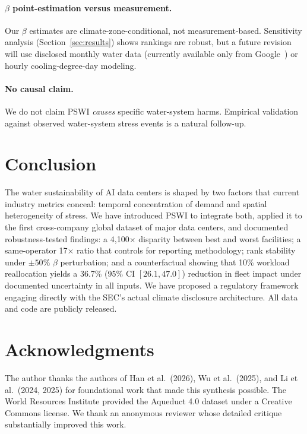 \documentclass[conference,10pt]{IEEEtran}
\begin{document}
\paragraph{$\beta$ point-estimation versus measurement.}
Our $\beta$ estimates are climate-zone-conditional, not measurement-based.
Sensitivity analysis (Section~\ref{sec:results}) shows rankings are
robust, but a future revision will use disclosed monthly water data
(currently available only from Google~\cite{google2025envreport}) or
hourly cooling-degree-day modeling.

\paragraph{No causal claim.}
We do not claim PSWI \emph{causes} specific water-system harms.
Empirical validation against observed water-system stress events is a
natural follow-up.

\section{Conclusion}
\label{sec:conclusion}

The water sustainability of AI data centers is shaped by two factors
that current industry metrics conceal: temporal concentration of
demand and spatial heterogeneity of stress. We have introduced PSWI
to integrate both, applied it to the first cross-company global
dataset of major data centers, and documented robustness-tested
findings: a 4{,}100$\times$ disparity between best and worst facilities;
a same-operator 17$\times$ ratio that controls for reporting
methodology; rank stability under $\pm 50\%$ $\beta$ perturbation;
and a counterfactual showing that 10\% workload reallocation yields a
36.7\% (95\% CI $[26.1, 47.0]$) reduction in fleet impact under
documented uncertainty in all inputs. We have proposed a regulatory
framework engaging directly with the SEC's actual climate disclosure
architecture. All data and code are publicly released.

\section*{Acknowledgments}

The author thanks the authors of Han et al.~(2026), Wu et al.~(2025),
and Li et al.~(2024, 2025) for foundational work that made this
synthesis possible. The World Resources Institute provided the
Aqueduct 4.0 dataset under a Creative Commons license. We thank an
anonymous reviewer whose detailed critique substantially improved this
work.



\end{document}
